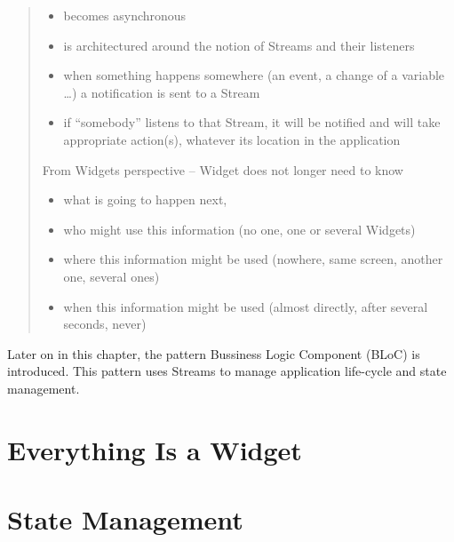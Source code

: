 \begin{quote}
    \begin{itemize}
        \item becomes asynchronous
        \item is architectured around the notion of Streams and their listeners
        \item when something happens somewhere (an event, a change of a variable …) a notification is sent to a Stream
        \item if ``somebody'' listens to that Stream, it will be notified and will take appropriate action(s), whatever its location in the application
    \end{itemize}
    
    From Widgets perspective -- Widget does not longer need to know
    
    \begin{itemize}
        \item what is going to happen next,
        \item who might use this information (no one, one or several Widgets)
        \item where this information might be used (nowhere, same screen, another one, several ones)
        \item when this information might be used (almost directly, after several seconds, never)
    \end{itemize}
\end{quote}

Later on in this chapter, the pattern Bussiness Logic Component (BLoC) is introduced. This pattern uses Streams to manage application life-cycle and state management. 
\section{Everything Is a Widget}


\section{State Management}

